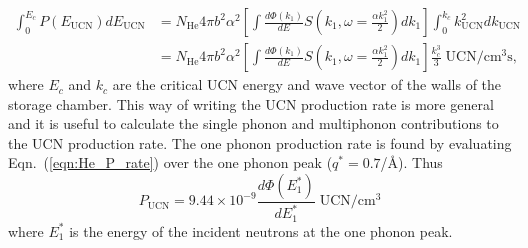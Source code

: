 \begin{equation}
\label{eqn:He_P_rate}
\begin{split}
\int _0 ^{E_c} P(E_{\text{UCN}})dE_{\text{UCN}} &= N_{\text{He}} 4 \pi b^2
\alpha^2 \left[ \int \frac{d\Phi(k_1)}{dE} S \left( k_1,
  \omega=\frac{\alpha k_1^2}{2} \right)dk_1 \right] \int_0^{k_c}
k_{\text{UCN}}^2dk_{\text{UCN}} \\ &=N_{\text{He}} 4 \pi b^2 \alpha^2 \left[
  \int \frac{d\Phi(k_1)}{dE} S \left( k_1, \omega=\frac{\alpha
    k_1^2}{2} \right) dk_1 \right] \frac{k_c^3}{3}\;
\text{UCN}/\text{cm}^3 \text{s},
\end{split}
\end{equation}
where $E_c$ and $k_c$ are the critical UCN energy and wave vector of
the walls of the storage chamber. This way of writing the UCN
production rate is more general and it is useful to calculate the
single phonon and multiphonon contributions to the UCN production
rate. The one phonon production rate is found by evaluating
Eqn.~(\ref{eqn:He_P_rate}) over the one phonon peak ($q^*=0.7$/\AA).
Thus
\begin{equation}
P_{\text{UCN}}=9.44 \times 10^{-9}\frac{d\Phi (E_1^*)}{dE_1^*} \;
\text{UCN}/\text{cm}^3
\end{equation}
 where $E_1^*$ is the energy of the incident neutrons at the one phonon peak.






